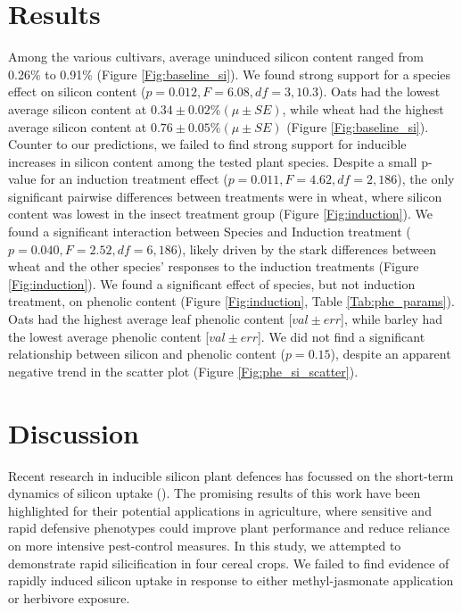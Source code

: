 \documentclass[12pt, letterpaper, ]{report}
\begin{document}
\section{Results}
Among the various cultivars, average uninduced silicon content ranged from 0.26\% to 0.91\% (Figure \ref{Fig:baseline_si}). We found strong support for a species effect on silicon content ($p=0.012, F = 6.08, df=3,10.3$). Oats had the lowest average silicon content at $0.34 \pm 0.02\% (\mu \pm SE)$, while wheat had the highest average silicon content at $0.76 \pm 0.05\% (\mu \pm SE)$ (Figure \ref{Fig:baseline_si}). Counter to our predictions, we failed to find strong support for inducible increases in silicon content among the tested plant species. Despite a small p-value for an induction treatment effect ($p = 0.011, F = 4.62, df =2, 186$), the only significant pairwise differences between treatments were in wheat, where silicon content was lowest in the insect treatment group (Figure \ref{Fig:induction}). We found a significant interaction between Species and Induction treatment ($p = 0.040, F = 2.52, df = 6,186$), likely driven by the stark differences between wheat and the other species' responses to the induction treatments (Figure \ref{Fig:induction}).
We found a significant effect of species, but not induction treatment, on phenolic content (Figure \ref{Fig:induction}, Table \ref{Tab:phe_params}). Oats had the highest average leaf phenolic content [$val \pm err$], while barley had the lowest average phenolic content [$val \pm err$]. 
We did not find a significant relationship between silicon and phenolic content ($p = 0.15$), despite an apparent negative trend in the scatter plot (Figure \ref{Fig:phe_si_scatter}).

\section{Discussion}

Recent research in inducible silicon plant defences has focussed on the short-term dynamics of silicon uptake (\cite{waterman_short-term_2021,waterman_short-term_2021-1}). The promising results of this work have been highlighted for their potential applications in agriculture, where sensitive and rapid defensive phenotypes could improve plant performance and reduce reliance on more intensive pest-control measures. In this study, we attempted to demonstrate rapid silicification in four cereal crops. We failed to find evidence of rapidly induced silicon uptake in response to either methyl-jasmonate application or herbivore exposure. 
\end{document}
